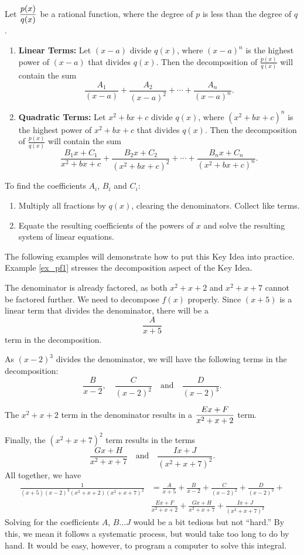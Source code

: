 {Let $\displaystyle \frac{p(x)}{q(x)}$ be a rational function, where the degree of $p$ is less than the degree of $q$.
\begin{enumerate}
	\item	\textbf{Linear Terms:} Let $(x-a)$ divide $q(x)$, where $(x-a)^n$ is the highest power of $(x-a)$ that divides $q(x)$. Then the decomposition of $\frac{p(x)}{q(x)}$ will contain the sum
	$$\frac{A_1}{(x-a)} + \frac{A_2}{(x-a)^2} + \cdots +\frac{A_n}{(x-a)^n}.$$
	\item		\textbf{Quadratic Terms:} Let $x^2+bx+c$ divide $q(x)$, where $(x^2+bx+c)^n$ is the highest power of $x^2+bx+c$ that divides $q(x)$. Then the decomposition of $\frac{p(x)}{q(x)}$ will contain the sum 
	$$\frac{B_1x+C_1}{x^2+bx+c}+\frac{B_2x+C_2}{(x^2+bx+c)^2}+\cdots+\frac{B_nx+C_n}{(x^2+bx+c)^n}.$$
	\end{enumerate}
	To find the coefficients $A_i$, $B_i$ and $C_i$:
	\begin{enumerate}
	\item	Multiply all fractions by $q(x)$, clearing the denominators. Collect like terms.
	\item		Equate the resulting coefficients of the powers of $x$ and solve the resulting system of linear equations.
	\end{enumerate}
}

The following examples will demonstrate how to put this Key Idea into practice. Example \ref{ex_pf1} stresses the decomposition aspect of the Key Idea.\\

{The denominator is already factored, as both $x^2+x+2$ and $x^2+x+7$ cannot be factored further. We need to decompose $f(x)$ properly. Since $(x+5)$ is a linear term that divides the denominator, there will be a $$\frac{A}{x+5}$$ term in the decomposition.

As $(x-2)^3$ divides the denominator, we will have the following terms in the decomposition:
$$\frac{B}{x-2},\quad \frac{C}{(x-2)^2}\quad \text{and}\quad \frac{D}{(x-2)^3}.$$

The $x^2+x+2$ term in the denominator results in a $\displaystyle\frac{Ex+F}{x^2+x+2}$ term.

Finally, the $(x^2+x+7)^2$ term results in the terms $$\frac{Gx+H}{x^2+x+7}\quad \text{and}\quad \frac{Ix+J}{(x^2+x+7)^2}.$$
All together, we have 
\begin{align*}
\frac{1}{(x+5)(x-2)^3(x^2+x+2)(x^2+x+7)^2} &= \frac{A}{x+5} + \frac{B}{x-2}+ \frac{C}{(x-2)^2}+\frac{D}{(x-2)^3}+ \\
		& \frac{Ex+F}{x^2+x+2}+\frac{Gx+H}{x^2+x+7}+\frac{Ix+J}{(x^2+x+7)^2}
\end{align*}
Solving for the coefficients $A$, $B \ldots J$ would be a bit tedious but not ``hard.''  By this, we mean it follows a systematic process, but would take too long to do by hand.  It would be easy, however, to program a computer to solve this integral.
}\\

